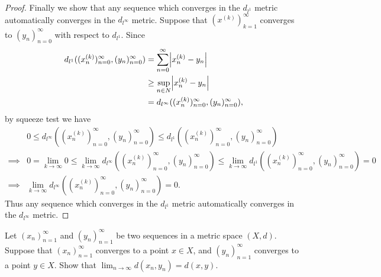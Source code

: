 \begin{proof}
    Finally we show that any sequence which converges in the \(d_{l^1}\) metric automatically converges in the \(d_{l^\infty}\) metric.
    Suppose that \((x^{(k)})_{k = 1}^\infty\) converges to \((y_n)_{n = 0}^\infty\) with respect to \(d_{l^1}\).
    Since
    \begin{align*}
        d_{l^1}((x_n^{(k)})_{n = 0}^\infty, (y_n)_{n = 0}^\infty) & = \sum_{n = 0}^\infty \abs*{x_n^{(k)} - y_n}                      \\
                                                                  & \geq \sup_{n \in N} \abs*{x_n^{(k)} - y_n}                        \\
                                                                  & = d_{l^\infty}((x_n^{(k)})_{n = 0}^\infty, (y_n)_{n = 0}^\infty),
    \end{align*}
    by squeeze test we have
    \begin{align*}
                 & 0 \leq d_{l^\infty}((x_n^{(k)})_{n = 0}^\infty, (y_n)_{n = 0}^\infty) \leq d_{l^1}((x_n^{(k)})_{n = 0}^\infty, (y_n)_{n = 0}^\infty)                                                                     \\
        \implies & 0 = \lim_{k \to \infty} 0 \leq \lim_{k \to \infty} d_{l^\infty}((x_n^{(k)})_{n = 0}^\infty, (y_n)_{n = 0}^\infty) \leq \lim_{k \to \infty} d_{l^1}((x_n^{(k)})_{n = 0}^\infty, (y_n)_{n = 0}^\infty) = 0 \\
        \implies & \lim_{k \to \infty} d_{l^\infty}((x_n^{(k)})_{n = 0}^\infty, (y_n)_{n = 0}^\infty) = 0.
    \end{align*}
    Thus any sequence which converges in the \(d_{l^1}\) metric automatically converges in the \(d_{l^\infty}\) metric.
\end{proof}

\begin{exercise}\label{ex 1.1.16}
    Let \((x_n)_{n = 1}^\infty\) and \((y_n)_{n = 1}^\infty\) be two sequences in a metric space \((X, d)\).
    Suppose that \((x_n)_{n = 1}^\infty\) converges to a point \(x \in X\), and \((y_n)_{n = 1}^\infty\) converges to a point \(y \in X\).
    Show that \(\lim_{n \to \infty} d(x_n, y_n) = d(x, y)\).
\end{exercise}

